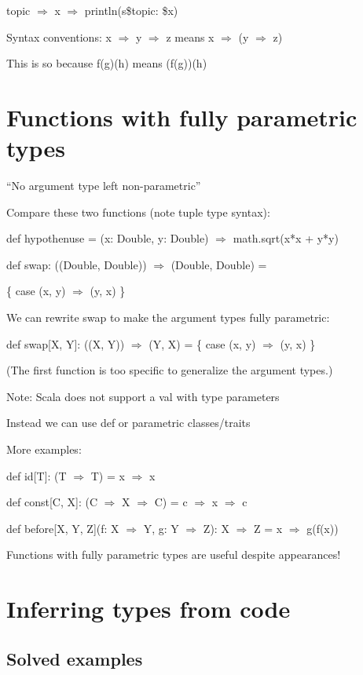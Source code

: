   topic $\Rightarrow$ x $\Rightarrow$ println(s\textquotedbl\$topic:
\$x\textquotedbl )

Syntax conventions: x $\Rightarrow$ y $\Rightarrow$ z means x $\Rightarrow$
(y $\Rightarrow$ z)

This is so because f(g)(h) means (f(g))(h) 

\section{Functions with fully parametric types}

``No argument type left non-parametric''

Compare these two functions (note tuple type syntax):

def hypothenuse = (x: Double, y: Double) $\Rightarrow$ math.sqrt(x{*}x
+ y{*}y)

def swap: ((Double, Double)) $\Rightarrow$ (Double, Double) =

  \{ case (x, y) $\Rightarrow$ (y, x) \} 

We can rewrite swap to make the argument types fully parametric:

def swap{[}X, Y{]}: ((X, Y)) $\Rightarrow$ (Y, X) = \{ case (x, y)
$\Rightarrow$ (y, x) \} 

(The first function is too specific to generalize the argument types.)

Note: Scala does not support a val with type parameters

Instead we can use def or parametric classes/traits

More examples:

def id{[}T{]}: (T $\Rightarrow$ T) = x $\Rightarrow$ x

def const{[}C, X{]}: (C $\Rightarrow$ X $\Rightarrow$ C) = c $\Rightarrow$
x $\Rightarrow$ c

def before{[}X, Y, Z{]}(f: X $\Rightarrow$ Y, g: Y $\Rightarrow$
Z): X $\Rightarrow$ Z = x $\Rightarrow$ g(f(x))

Functions with fully parametric types are useful despite appearances!

\section{Inferring types from code}

\subsection{Solved examples}

